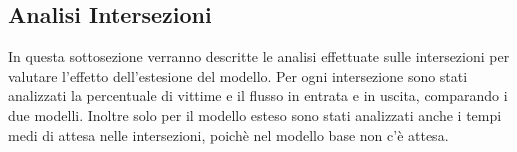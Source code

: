 





\newpage

\subsection{Analisi Intersezioni}
In questa sottosezione verranno descritte le analisi effettuate sulle intersezioni per valutare l'effetto dell'estesione
del modello. Per ogni intersezione sono stati analizzati la percentuale di vittime e il flusso in entrata e in uscita, comparando
i due modelli. Inoltre solo per il modello esteso sono stati analizzati anche i tempi medi di attesa nelle intersezioni,
poichè nel modello base non c'è attesa.

